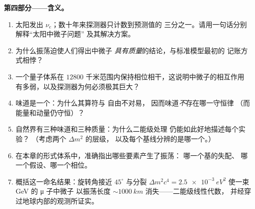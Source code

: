 \begin{problem}
\medskip\noindent\textbf{第四部分——含义。}
\begin{enumerate}[resume]
  \item 太阳发出 $\nu_e$；数十年来探测器只计数到预测值的
        三分之一。请用一句话分别解释“太阳中微子问题”
        及其解决方案。
  \item 为什么振荡迫使人们得出中微子
        \emph{具有质量}的结论，与标准模型最初的
        记账方式相悖？
  \item 一个量子体系在
        $12800$ 千米范围内保持相位相干，这说明中微子的相互作用
        有多弱，以及探测器为何必须极其巨大？
  \item 味道是一个：为什么其算符与
        自由不对易，
        因而味道\emph{不}存在哪一守恒律
        （而能量和动量仍守恒）？
  \item 自然界有三种味道和三种质量：为什么二能级处理
        仍能如此好地描述每个实验？
        （考虑两个 $\Delta m^2$ 的层级，
        以及每个基线分辨的是哪一个。）
  \item 在本章的形式体系中，准确指出哪些要素产生了振荡：
        哪一个基的失配、
        哪一个假设、哪一个相位。
  \item 概括这一命名结果：旋转角接近
        $45^\circ$ 与分裂 $\Delta m^2c^4 =
        \qty{2.5e-3}{eV^2}$ 使一束 GeV 的 μ 子中微子
        以振荡长度 $\sim\qty{1000}{km}$ 消失——二能级线性代数，
        并经穿过地球内部的观测所证实。
\end{enumerate}
\end{problem}
